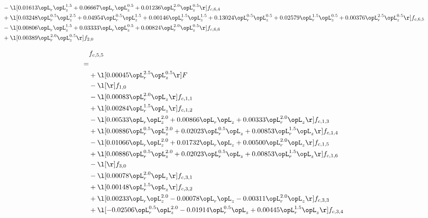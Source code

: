 \begin{alignat}{2}
& - \l[  0.01613 \opL_r \opL_z^{1.5} +  0.06667 \opL_r \opL_z^{0.5} +  0.01236 \opL_r^{2.0} \opL_z^{0.5}  \r] f_{c,6,4} \nonumber \\ 
& + \l[  0.03248 \opL_r^{0.5} \opL_z^{2.5} +  0.04954 \opL_r^{0.5} \opL_z^{1.5} +  0.00146 \opL_r^{1.5} \opL_z^{1.5} +  0.13024 \opL_r^{0.5} \opL_z^{0.5} +  0.02579 \opL_r^{1.5} \opL_z^{0.5} +  0.00376 \opL_r^{2.5} \opL_z^{0.5}  \r] f_{c,6,5} \nonumber \\ 
& - \l[  0.00806 \opL_r \opL_z^{1.5} +  0.03333 \opL_r \opL_z^{0.5} +  0.00824 \opL_r^{2.0} \opL_z^{0.5}  \r] f_{c,6,6} \nonumber \\ 
& + \l[  0.00389 \opL_r^{2.0} \opL_z^{0.5}  \r] f_{2,0} \nonumber \\ 
\end{alignat} 


\begin{alignat}{2} 
\label{eq:f_55_1} 
& f_{c,5,5} \nonumber \\ 
 = \\ 
& + \l[  0.00045 \opL_r^{2.5} \opL_z^{0.5}  \r] F \nonumber \\ 
& - \l[  \r] f_{1,0} \nonumber \\ 
& - \l[  0.00083 \opL_r^{2.0} \opL_z  \r] f_{c,1,1} \nonumber \\ 
& + \l[  0.00284 \opL_r^{1.5} \opL_z  \r] f_{c,1,2} \nonumber \\ 
& - \l[  0.00533 \opL_r \opL_z^{2.0} +  0.00866 \opL_r \opL_z +  0.00333 \opL_r^{2.0} \opL_z  \r] f_{c,1,3} \nonumber \\ 
& + \l[  0.00886 \opL_r^{0.5} \opL_z^{2.0} +  0.02023 \opL_r^{0.5} \opL_z +  0.00853 \opL_r^{1.5} \opL_z  \r] f_{c,1,4} \nonumber \\ 
& - \l[  0.01066 \opL_r \opL_z^{2.0} +  0.01732 \opL_r \opL_z +  0.00500 \opL_r^{2.0} \opL_z  \r] f_{c,1,5} \nonumber \\ 
& + \l[  0.00886 \opL_r^{0.5} \opL_z^{2.0} +  0.02023 \opL_r^{0.5} \opL_z +  0.00853 \opL_r^{1.5} \opL_z  \r] f_{c,1,6} \nonumber \\ 
& - \l[  \r] f_{3,0} \nonumber \\ 
& - \l[  0.00078 \opL_r^{2.0} \opL_z  \r] f_{c,3,1} \nonumber \\ 
& + \l[  0.00148 \opL_r^{1.5} \opL_z  \r] f_{c,3,2} \nonumber \\ 
& + \l[  0.00233 \opL_r \opL_z^{2.0}   -0.00078 \opL_r \opL_z   -0.00311 \opL_r^{2.0} \opL_z  \r] f_{c,3,3} \nonumber \\ 
& + \l[  -0.02506 \opL_r^{0.5} \opL_z^{2.0}   -0.01914 \opL_r^{0.5} \opL_z +  0.00445 \opL_r^{1.5} \opL_z  \r] f_{c,3,4} \nonumber \\ 

\end{alignat}
